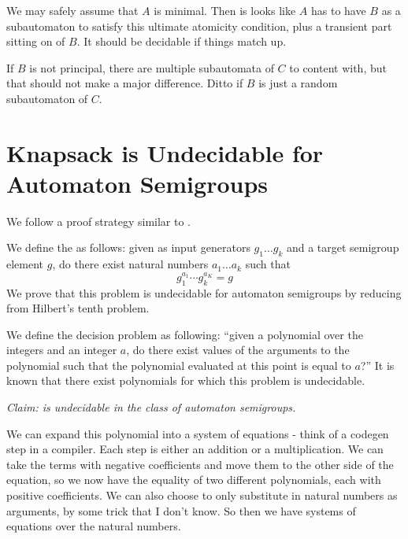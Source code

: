 \documentclass[11pt]{article}
\begin{document}
We may safely assume that $A$ is minimal. Then is looks like $A$ has
to have $B$ as a subautomaton to satisfy this ultimate atomicity
condition, plus a transient part sitting on of $B$. It should be
decidable if things match up.

If $B$ is not principal, there are multiple subautomata of $C$ to
content with, but that should not make a major difference. Ditto if
$B$ is just a random subautomaton of $C$.

%

\section{Knapsack is Undecidable for Automaton Semigroups}
We follow a proof strategy similar to \cite{Konig15:knapsack}.

We define the  as follows: given as input
generators $g_1 \ldots g_k$ and a target semigroup element $g$, do there
exist natural numbers $a_1\ldots a_k$ such that
\[ g_1^{a_1} \cdots g_k^{a_K} = g \] We prove that this problem is
undecidable for automaton semigroups by reducing from %
Hilbert's tenth problem.

We define the decision problem  as following: ``given
a polynomial over the integers and an integer $a$, do there exist
values of the arguments to the polynomial such that the polynomial
evaluated at this point is equal to $a$?'' It is known that there
exist polynomials for which this problem is undecidable.

\textit{Claim:  is undecidable in the class of automaton semigroups.}

We can expand this polynomial into a system of equations - think of a
codegen step in a compiler. Each step is either an addition or a
multiplication. We can take the terms with negative coefficients and
move them to the other side of the equation, so we now have the
equality of two different polynomials, each with positive
coefficients. We can also choose to only substitute in natural numbers
as arguments, by some trick that I don't know. So then we have systems
of equations over the natural numbers.
\end{document}

